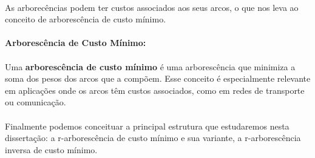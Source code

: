 \documentclass[12pt,a4paper]{article}
\begin{document}
\paragraph{}
As arborecências podem ter custos associados aos seus arcos, o que nos leva ao conceito de arborescência de custo mínimo.

\paragraph{Arborescência de Custo Mínimo:}
\paragraph{}
Uma \textbf{arborescência de custo mínimo} é uma arborescência que minimiza a soma dos pesos dos arcos que a compõem. Esse conceito é especialmente relevante em aplicações onde os arcos têm custos associados, como em redes de transporte ou comunicação.

\paragraph{}
Finalmente podemos conceituar a principal estrutura que estudaremos nesta dissertação: a r-arborescência de custo mínimo e sua variante, a r-arborescência inversa de custo mínimo.
\end{document}
